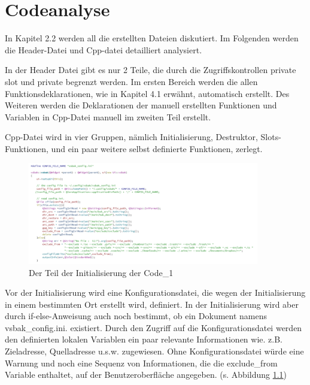 \chapter{Codeanalyse}

In Kapitel 2.2 werden all die erstellten Dateien diskutiert. Im Folgenden werden die Header-Datei und Cpp-datei detailliert analysiert.  
\par In der Header Datei gibt es nur 2 Teile, die durch die Zugriffskontrollen private slot und private begrenzt werden. Im ersten Bereich werden die allen Funktionsdeklarationen, wie in Kapitel 4.1 erwähnt, automatisch erstellt. Des Weiteren werden die Deklarationen der manuell erstellten Funktionen und Variablen in Cpp-Datei manuell im zweiten Teil erstellt.
\par Cpp-Datei wird in vier Gruppen, nämlich Initialisierung, Destruktor, Slots-Funktionen, und ein paar weitere selbst definierte Funktionen, zerlegt.

\begin{figure}[h!]
	\centering
	\includegraphics[width=0.9\textwidth]{bilder/code_init_1.png}
	\caption {Der Teil der Initialisierung der Code\_1 }
	\label{Abbildung_18}
\end{figure}


 Vor der Initialisierung wird eine Konfigurationsdatei, die wegen der Initialisierung in einem bestimmten Ort erstellt wird, definiert. In der Initialisierung wird aber durch if-else-Anweisung auch noch bestimmt, ob ein Dokument namens vsbak\_config.ini. existiert. Durch den Zugriff auf die Konfigurationsdatei werden den definierten lokalen Variablen ein paar relevante Informationen wie. z.B. Zieladresse, Quelladresse u.s.w. zugewiesen. Ohne Konfigurationsdatei würde eine Warnung und noch eine Sequenz von Informationen, die die exclude\_from Variable enthaltet,  auf der Benutzeroberfläche angegeben. (s. Abbildung \ref{Abbildung_18})

